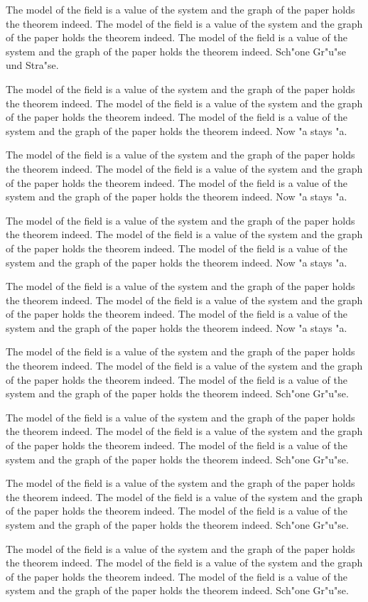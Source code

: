 \documentclass{article}
\begin{document}
The model of the field is a value of the system and the graph of the paper holds the theorem indeed. The model of the field is a value of the system and the graph of the paper holds the theorem indeed. The model of the field is a value of the system and the graph of the paper holds the theorem indeed. Sch"one Gr"u"se und Stra"se.


The model of the field is a value of the system and the graph of the paper holds the theorem indeed. The model of the field is a value of the system and the graph of the paper holds the theorem indeed. The model of the field is a value of the system and the graph of the paper holds the theorem indeed. Now "a stays "a.

The model of the field is a value of the system and the graph of the paper holds the theorem indeed. The model of the field is a value of the system and the graph of the paper holds the theorem indeed. The model of the field is a value of the system and the graph of the paper holds the theorem indeed. Now "a stays "a.

The model of the field is a value of the system and the graph of the paper holds the theorem indeed. The model of the field is a value of the system and the graph of the paper holds the theorem indeed. The model of the field is a value of the system and the graph of the paper holds the theorem indeed. Now "a stays "a.

The model of the field is a value of the system and the graph of the paper holds the theorem indeed. The model of the field is a value of the system and the graph of the paper holds the theorem indeed. The model of the field is a value of the system and the graph of the paper holds the theorem indeed. Now "a stays "a.


The model of the field is a value of the system and the graph of the paper holds the theorem indeed. The model of the field is a value of the system and the graph of the paper holds the theorem indeed. The model of the field is a value of the system and the graph of the paper holds the theorem indeed. Sch"one Gr"u"se.

The model of the field is a value of the system and the graph of the paper holds the theorem indeed. The model of the field is a value of the system and the graph of the paper holds the theorem indeed. The model of the field is a value of the system and the graph of the paper holds the theorem indeed. Sch"one Gr"u"se.

The model of the field is a value of the system and the graph of the paper holds the theorem indeed. The model of the field is a value of the system and the graph of the paper holds the theorem indeed. The model of the field is a value of the system and the graph of the paper holds the theorem indeed. Sch"one Gr"u"se.

The model of the field is a value of the system and the graph of the paper holds the theorem indeed. The model of the field is a value of the system and the graph of the paper holds the theorem indeed. The model of the field is a value of the system and the graph of the paper holds the theorem indeed. Sch"one Gr"u"se.
\end{document}
